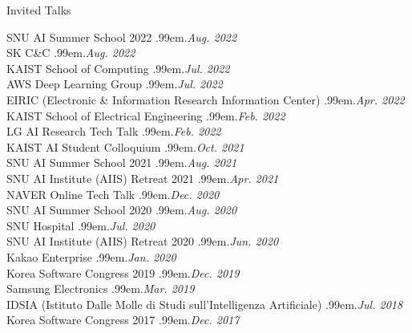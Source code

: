 \documentclass{resume} %
\makeatletter
\newcommand \Dotfill {\leavevmode \cleaders \hb@xt@ .99em{\hss .\hss }\hfill \kern \z@}
\makeatother
\begin{document}
\begin{rSection}{Invited Talks}

SNU AI Summer School 2022 \smallskip \Dotfill \emph{Aug. 2022} \\ 
SK C\&C \smallskip \Dotfill \emph{Aug. 2022} \\ 
KAIST School of Computing \smallskip \Dotfill \emph{Jul. 2022} \\ 
AWS Deep Learning Group \smallskip \Dotfill \emph{Jul. 2022} \\ 
EIRIC (Electronic \& Information Research Information Center) \smallskip \Dotfill \emph{Apr. 2022} \\ 
KAIST School of Electrical Engineering \smallskip \Dotfill \emph{Feb. 2022} \\ 
LG AI Research Tech Talk \smallskip \Dotfill \emph{Feb. 2022} \\ 
KAIST AI Student Colloquium \smallskip \Dotfill \emph{Oct. 2021} \\ 
SNU AI Summer School 2021 \smallskip \Dotfill \emph{Aug. 2021} \\ 
SNU AI Institute (AIIS) Retreat 2021 \smallskip \Dotfill \emph{Apr. 2021} \\ 
NAVER Online Tech Talk \smallskip \Dotfill \emph{Dec. 2020} \\ 
SNU AI Summer School 2020 \smallskip \Dotfill \emph{Aug. 2020} \\ 
SNU Hospital \smallskip \Dotfill \emph{Jul. 2020} \\ 
SNU AI Institute (AIIS) Retreat 2020 \smallskip \Dotfill \emph{Jun. 2020}\\ 
Kakao Enterprise \smallskip \Dotfill \emph{Jan. 2020} \\ 
Korea Software Congress 2019 \smallskip \Dotfill \emph{Dec. 2019} \\ 
Samsung Electronics \smallskip \Dotfill \emph{Mar. 2019} \\ 
IDSIA (Istituto Dalle Molle di Studi sull'Intelligenza Artificiale) \smallskip \Dotfill \emph{Jul. 2018} \\ 
Korea Software Congress 2017 \smallskip \Dotfill \emph{Dec. 2017}

\end{rSection}
\end{document}
